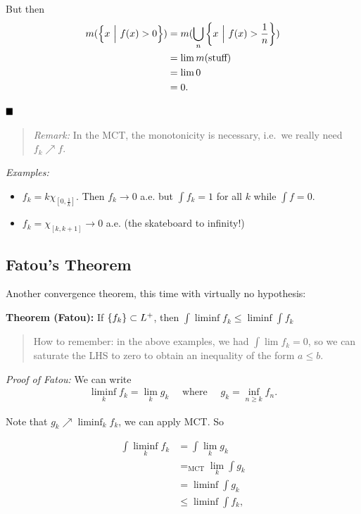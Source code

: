 But then \begin{align*}
m(\left\{{x {~\mathrel{\Big|}~} f(x) > 0}\right\}) 
&= m(\bigcup_n \left\{{x{~\mathrel{\Big|}~} f(x) > \frac 1 n}\right\}) \\
&= \lim m(\text{stuff}) \\
&= \lim 0 \\ 
&= 0
.\end{align*}

\(\qed\)

\begin{quote}
\emph{Remark:} In the MCT, the monotonicity is necessary, i.e.~we really
need \(f_k \nearrow f\).
\end{quote}

\emph{Examples:}

\begin{itemize}
\item
  \(f_k = k \chi_{[0, \frac 1 k]}\). Then \(f_k \to 0\) a.e. but
  \(\int f_k = 1\) for all \(k\) while \(\int f = 0\).
\item
  \(f_k = \chi_{[k, k+1]} \to 0\) a.e. (the skateboard to infinity!)
\end{itemize}

\hypertarget{fatous-theorem}{%
\subsection{Fatou's Theorem}\label{fatous-theorem}}

Another convergence theorem, this time with virtually no hypothesis:

\textbf{Theorem (Fatou):} If \(\left\{{f_k}\right\} \subset L^+\), then
\(\int \liminf f_k \leq \liminf \int f_k\)

\begin{quote}
How to remember: in the above examples, we had \(\int \lim f_k = 0\), so
we can saturate the LHS to zero to obtain an inequality of the form
\(a\leq b\).
\end{quote}

\emph{Proof of Fatou:} We can write
\begin{align*}
\liminf_k f_k = \lim_k g_k \quad \text{ where }\quad  g_k = \inf_{n \geq k} f_n
.\end{align*}

Note that \(g_k \nearrow \liminf_k f_k\), we can apply MCT. So

\begin{align*}
\int \liminf_k f_k 
&= \int \lim_k g_k \\
&=_\text{MCT} \lim_k \int g_k \\
&= \liminf \int g_k \\
&\leq \liminf \int f_k
,\end{align*}

